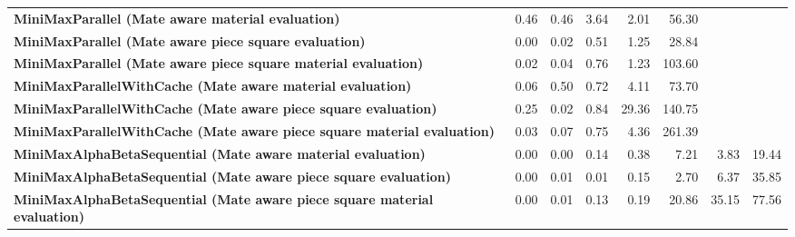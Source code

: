 \begin{table}[H]
{\begin{tabular}{|p{8cm}|*{7}{r|}}
            \rowcolor[HTML]{FFFFFF}
            \textbf{MiniMaxParallel (Mate aware material evaluation)}                                   & 0.46                                  & 0.46                                  & 3.64                                  & 2.01                                  & 56.30 &  &  \\
            \rowcolor[HTML]{EFEFEF}
            \textbf{MiniMaxParallel (Mate aware piece square evaluation)}                               & 0.00                                  & 0.02                                  & 0.51                                  & 1.25 & 28.84 &  &  \\
            \rowcolor[HTML]{FFFFFF}
            \textbf{MiniMaxParallel (Mate aware piece square material evaluation)}                      & 0.02                                  & 0.04 & 0.76 & 1.23 & 103.60 &  &  \\

            \rowcolor[HTML]{EFEFEF}
            \textbf{MiniMaxParallelWithCache (Mate aware material evaluation)}                          & 0.06                                  & 0.50                                  & 0.72 & 4.11 & 73.70 &  &  \\
            \rowcolor[HTML]{FFFFFF}
            \textbf{MiniMaxParallelWithCache (Mate aware piece square evaluation)}                      & 0.25                                  & 0.02 & 0.84 & 29.36 & 140.75 &  &  \\
            \rowcolor[HTML]{EFEFEF}
            \textbf{MiniMaxParallelWithCache (Mate aware piece square material evaluation)}             & 0.03 & 0.07 & 0.75 & 4.36 & 261.39 &  &  \\

            \rowcolor[HTML]{FFFFFF}
            \textbf{MiniMaxAlphaBetaSequential (Mate aware material evaluation)}                        & 0.00                                  & 0.00                                  & 0.14 & 0.38 & 7.21 & 3.83 & 19.44 \\
            \rowcolor[HTML]{EFEFEF}
            \textbf{MiniMaxAlphaBetaSequential (Mate aware piece square evaluation)}                    & 0.00                                  & 0.01 & 0.01 & 0.15 & 2.70 & 6.37 & 35.85 \\
            \rowcolor[HTML]{FFFFFF}
            \textbf{MiniMaxAlphaBetaSequential (Mate aware piece square material evaluation)}               & 0.00 & 0.01 & 0.13 & 0.19 & 20.86 & 35.15 & 77.56 \\


\end{tabular}}
\end{table}
